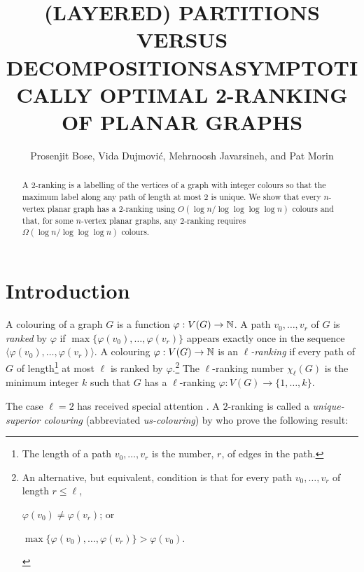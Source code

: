 \documentclass[kpfonts]{patmorin}
\title{\MakeUppercase{(Layered) Partitions versus Decompositions}}
\author{}
\title{\MakeUppercase{Asymptotically Optimal 2-Ranking of Planar Graphs}}
\author{Prosenjit Bose, Vida Dujmović, Mehrnoosh Javarsineh, and Pat Morin}
\theoremstyle{named}
\begin{document}
\begin{titlepage}
\maketitle

\begin{abstract}
  A 2-ranking is a labelling of the vertices of a graph with integer colours so that the maximum label along any path of length at most 2 is unique.  We show that every $n$-vertex planar graph has a 2-ranking using $O(\log n/\log\log\log\log n)$ colours and that, for some $n$-vertex planar graphs, any 2-ranking requires $\Omega(\log n/\log\log\log n)$ colours.
\end{abstract}
\end{titlepage}

\tableofcontents

\newpage
{}

\section{Introduction}


A colouring of a graph $G$ is a function $\varphi:V(G)\to \mathbb{N}$.  A path $v_0,\ldots,v_r$ of $G$ is \emph{ranked} by $\varphi$ if $\max\{\varphi(v_0),\ldots,\varphi(v_r)\}$ appears exactly once in the sequence $\langle \varphi(v_0),\ldots,\varphi(v_r)\rangle$.  A colouring $\varphi:V(G)\to \mathbb{N}$ is an \emph{$\ell$-ranking} if every path of $G$ of length\footnote{The length of a path $v_0,\ldots,v_r$ is the number, $r$, of edges in the path.} at most $\ell$ is ranked by $\varphi$.\footnote{An alternative, but equivalent, condition is that for every path $v_0,\ldots,v_r$ of length $r\le\ell$,
\begin{inparaenum}[(i)]
   \item $\varphi(v_0)\neq \varphi(v_r)$; or
   \item $\max\{\varphi(v_0),\ldots,\varphi(v_r)\} > \varphi(v_0)$.
\end{inparaenum}
}
The $\ell$-ranking number $\chi_\ell(G)$ is the minimum integer $k$ such that $G$ has a $\ell$-ranking $\varphi:V(G)\to \{1,\ldots,k\}$.

The case $\ell=2$ has received special attention \cite{almeter.demircan.ea:graph,karpas.neiman.ea:on}. A $2$-ranking is called a \emph{unique-superior colouring} (abbreviated \emph{us-colouring}) by \citet{karpas.neiman.ea:on} who prove the following result:
\end{document}
